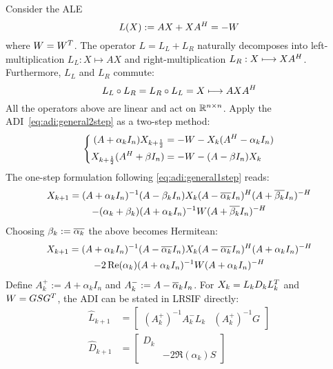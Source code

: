 Consider the \ac{ALE}
\begin{equation*}
\label{eq:adi:ale}
  L(X) := AX + XA^H = -W
\end{equation*}
where $W = W^T$.
The \Lyapunov operator $L = L_L + L_R$ naturally decomposes into
left-multiplication $L_L : X \mapsto AX$ and
right-multiplication $L_R : X \longmapsto XA^H$.
Furthermore, $L_L$ and $L_R$ commute:
\begin{equation*}
  L_L \circ L_R = L_R \circ L_L = X \longmapsto AXA^H
\end{equation*}
All the operators above are linear and act on $\mathbb{R}^{n\times n}$.
Apply the \ac{ADI}~\eqref{eq:adi:general2step} as a two-step method:
\begin{equation}
  \left\{
  \begin{aligned}
    (A + \alpha_k I_n) X_{k+\frac{1}{2}} &= -W - X_k (A^H - \alpha_k I_n) \\
    X_{k+\frac{1}{2}} (A^H + \beta I_n) &= -W - (A - \beta I_n) X_k
  \end{aligned}
  \right.
\end{equation}
The one-step formulation following \eqref{eq:adi:general1step} reads:
\begin{multline}
  X_{k+1} =
  (A + \alpha_k I_n)^{-1}
  (A - \beta_k I_n)
  X_k
  (A - \conj{\alpha_k} I_n)^\HT
  (A + \conj{\beta_k} I_n)^{-H}
  \\
  - (\alpha_k + \beta_k)
  (A + \alpha_k I_n)^{-1}
  W
  (A + \conj{\beta_k} I_n)^{-\HT}
\end{multline}
Choosing $\beta_k := \conj{\alpha_k}$
the above becomes Hermitean:
\begin{multline}
\label{eq:adi:ale1step}
  X_{k+1} =
  (A + \alpha_k I_n)^{-1}
  (A - \conj{\alpha_k} I_n)
  X_k
  (A - \conj{\alpha_k} I_n)^\HT
  (A + \alpha_k I_n)^{-H}
  \\
  - 2\Re(\alpha_k)
  (A + \alpha_k I_n)^{-1}
  W
  (A + \alpha_k I_n)^{-\HT}
\end{multline}
Define
$A^+_k := A + \alpha_k I_n$ and
$A^-_k := A - \conj\alpha_k I_n$.
For $X_k = L_k D_k L_k^T$ and $W = GSG^T$,
the \ac{ADI} can be stated in \ac{LRSIF} directly:
\begin{align*}
  \hat L_{k+1} &= \begin{bmatrix}
    (A^+_k)^{-1} A^-_k L_k &
    (A^+_k)^{-1} G
  \end{bmatrix} \\
  \hat D_{k+1} &= \begin{bmatrix}
    D_k \\
    & -2\Re(\alpha_k) S
  \end{bmatrix}
\end{align*}

